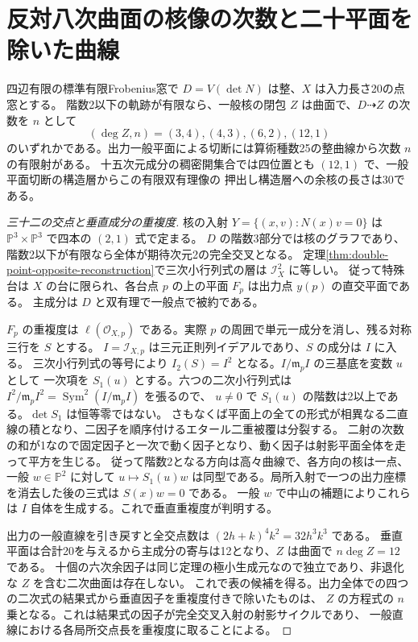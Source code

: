 \section{反対八次曲面の核像の次数と二十平面を除いた曲線}
\label{sec:octic-kernel-image-degree}
\begin{theorem}\label{thm:octic-kernel-image-degree}
四辺有限の標準有限Frobenius窓で $D=V(\det N)$ は整、$X$ は入力長さ20の点窓とする。
階数2以下の軌跡が有限なら、一般核の閉包 $Z$ は曲面で、$D\dashrightarrow Z$ の次数を $n$ として
\[
               (\deg Z,n)=(3,4),(4,3),(6,2),(12,1)
\]
のいずれかである。出力一般平面による切断には算術種数25の整曲線から次数 $n$ の有限射がある。
十五次元成分の稠密開集合では四位置とも $(12,1)$ で、一般平面切断の構造層からこの有限双有理像の
押出し構造層への余核の長さは30である。
\end{theorem}
\begin{proof}[三十二の交点と垂直成分の重複度]
核の入射 $Y=\{(x,v):N(x)v=0\}$ は $\mathbb P^3\times\mathbb P^3$ で四本の $(2,1)$ 式で定まる。
$D$ の階数3部分では核のグラフであり、階数2以下が有限なら全体が期待次元2の完全交叉となる。
定理\ref{thm:double-point-opposite-reconstruction}で三次小行列式の層は $\mathcal I_X^2$ に等しい。
従って特殊台は $X$ の台に限られ、各台点 $p$ の上の平面 $F_p$ は出力点 $y(p)$ の直交平面である。
主成分は $D$ と双有理で一般点で被約である。

$F_p$ の重複度は $\ell(\mathcal O_{X,p})$ である。実際 $p$ の周囲で単元一成分を消し、残る対称三行を $S$ とする。
$I=\mathcal I_{X,p}$ は三元正則列イデアルであり、$S$ の成分は $I$ に入る。
三次小行列式の等号により $I_2(S)=I^2$ となる。$I/\mathfrak m_p I$ の三基底を変数 $u$ として
一次項を $S_1(u)$ とする。六つの二次小行列式は $I^2/\mathfrak m_p I^2=\operatorname{Sym}^2(I/\mathfrak m_p I)$ を張るので、
$u\ne0$ で $S_1(u)$ の階数は2以上である。$\det S_1$ は恒等零ではない。
さもなくば平面上の全ての形式が相異なる二直線の積となり、二因子を順序付けるエタール二重被覆は分裂する。
二射の次数の和が1なので固定因子と一次で動く因子となり、動く因子は射影平面全体を走って平方を生じる。
従って階数2となる方向は高々曲線で、各方向の核は一点、一般 $w\in\mathbb P^2$ に対して
$u\mapsto S_1(u)w$ は同型である。局所入射で一つの出力座標を消去した後の三式は $S(x)w=0$ である。
一般 $w$ で中山の補題によりこれらは $I$ 自体を生成する。これで垂直重複度が判明する。

出力の一般直線を引き戻すと全交点数は $(2h+k)^4 k^2=32h^3k^3$ である。
垂直平面は合計20を与えるから主成分の寄与は12となり、$Z$ は曲面で $n\deg Z=12$ である。
十個の六次余因子は同じ定理の極小生成元なので独立であり、非退化な $Z$ を含む二次曲面は存在しない。
これで表の候補を得る。出力全体での四つの二次式の結果式から垂直因子を重複度付きで除いたものは、
$Z$ の方程式の $n$ 乗となる。これは結果式の因子が完全交叉入射の射影サイクルであり、
一般直線における各局所交点長を重複度に取ることによる。
\end{proof}


